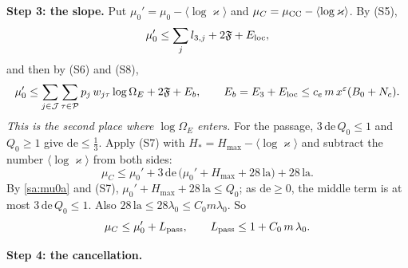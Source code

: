\documentclass[11pt,letterpaper]{article}
\begin{document}
\medskip
\noindent\textbf{Step 3: the slope.} Put $\mu_0'=\mu_0-\langle\log\varkappa\rangle$ and
$\mu_C=\mu_{\rm CC}-\langle\log\varkappa\rangle$. By (S5),
\begin{equation}\label{sa:mu0a}
 \mu_0'\le\sum_jl_{3,j}+2\mathfrak F+E_{\rm loc},
\end{equation}
and then by (S6) and (S8),
\begin{equation}\label{sa:mu0}
 \mu_0'\le\sum_{j\in\mathcal J}\sum_{\tau\in\mathcal P}p_j\,w_{j\tau}\log\Omega_E+2\mathfrak F+E_b,\qquad
 E_b=E_3+E_{\rm loc}\le c_e\,m\,x^{\varepsilon}(B_0+N_c).
\end{equation}
\emph{This is the second place where $\log\Omega_E$ enters.} For the passage, $3\,\mathrm{de}\,Q_0\le1$
and $Q_0\ge1$ give $\mathrm{de}\le\frac13$. Apply (S7) with $H_*=H_{\max}-\langle\log\varkappa\rangle$ and
subtract the number $\langle\log\varkappa\rangle$ from both sides:
\begin{equation}\label{D:276}
 \mu_C\le\mu_0'+3\,\mathrm{de}\,\big(\mu_0'+H_{\max}+28\,\mathrm{la}\big)+28\,\mathrm{la} .
\end{equation}
By \eqref{sa:mu0a} and (S7), $\mu_0'+H_{\max}+28\,\mathrm{la}\le Q_0$; as $\mathrm{de}\ge0$, the middle
term is at most $3\,\mathrm{de}\,Q_0\le1$. Also $28\,\mathrm{la}\le28\lambda_0\le C_0m\lambda_0$. So
\begin{equation}\label{sa:pass}
 \mu_C\le\mu_0'+L_{\rm pass},\qquad L_{\rm pass}\le1+C_0\,m\,\lambda_0 .
\end{equation}

\noindent\textbf{Step 4: the cancellation.}
\end{document}
